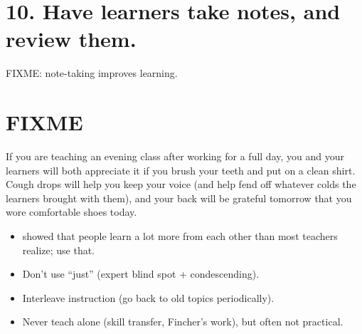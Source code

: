 \documentclass[10pt,letterpaper]{article}
\newcommand{\rulemajor}[1]{\section{#1}}
\begin{document}
\rulemajor{10. Have learners take notes, and review them.}

FIXME: note-taking improves learning.

\section*{FIXME}

If you are teaching an evening class after working for a full day,
you and your learners will both appreciate it if you brush your teeth and put on a clean shirt.
Cough drops will help you keep your voice (and help fend off whatever colds the learners brought with them),
and your back will be grateful tomorrow that you wore comfortable shoes today.

\begin{itemize}

\item \cite{Nuth2007} showed that people learn a lot more from each other
  than most teachers realize; use that.

\item Don't use ``just'' (expert blind spot + condescending).

\item Interleave instruction (go back to old topics periodically).

\item Never teach alone (skill transfer, Fincher's work), but often not practical.

\end{itemize}

\cite{Ambr2010}
\cite{Hust2012}
\cite{Lang2016}
\cite{Majo2015}
\cite{Maye2003}
\cite{Maye2009}
\cite{Mill1956}
\cite{Nuth2007}
\cite{Rice2018}
\cite{Wein2018a}
\cite{Wein2018b}
\cite{Wlod2017}


\end{document}
